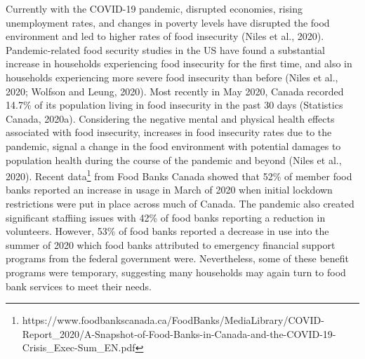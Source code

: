 \documentclass[]{elsarticle} %
\begin{document}
Currently with the COVID-19 pandemic, disrupted economies, rising
unemployment rates, and changes in poverty levels have disrupted the
food environment and led to higher rates of food insecurity (Niles et
al., 2020). Pandemic-related food security studies in the US have found
a substantial increase in households experiencing food insecurity for
the first time, and also in households experiencing more severe food
insecurity than before (Niles et al., 2020; Wolfson and Leung, 2020).
Most recently in May 2020, Canada recorded 14.7\% of its population
living in food insecurity in the past 30 days (Statistics Canada,
2020a). Considering the negative mental and physical health effects
associated with food insecurity, increases in food insecurity rates due
to the pandemic, signal a change in the food environment with potential
damages to population health during the course of the pandemic and
beyond (Niles et al., 2020). Recent data\footnote{https://www.foodbankscanada.ca/FoodBanks/MediaLibrary/COVID-Report\_2020/A-Snapshot-of-Food-Banks-in-Canada-and-the-COVID-19-Crisis\_Exec-Sum\_EN.pdf}
from Food Banks Canada showed that 52\% of member food banks reported an
increase in usage in March of 2020 when initial lockdown restrictions
were put in place across much of Canada. The pandemic also created
significant staffiing issues with 42\% of food banks reporting a
reduction in volunteers. However, 53\% of food banks reported a decrease
in use into the summer of 2020 which food banks attributed to emergency
financial support programs from the federal government were.
Nevertheless, some of these benefit programs were temporary, suggesting
many households may again turn to food bank services to meet their
needs.
\end{document}
